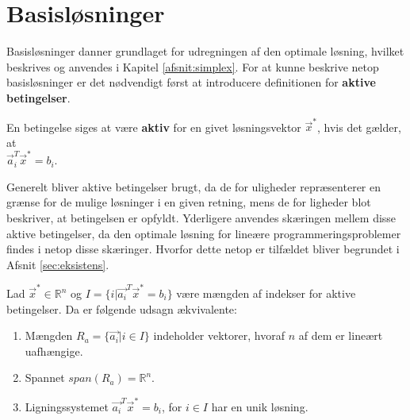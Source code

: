 \section{Basisløsninger}


Basisløsninger danner grundlaget for udregningen af den optimale løsning, hvilket beskrives og anvendes i Kapitel \ref{afsnit:simplex}. For at kunne beskrive netop basisløsninger er det nødvendigt først at introducere definitionen for \textbf{aktive betingelser}.%

\begin{defn}
En betingelse siges at være \textbf{aktiv} for en givet løsningsvektor $\vec{x}^*$, hvis det gælder, at\\ $\vec{a}_i^T \vec{x}^* = b_i$.
\label{def:aktiv}
\end{defn}

Generelt bliver aktive betingelser brugt, da de for uligheder repræsenterer en grænse for de mulige løsninger i en given retning, mens de for ligheder blot beskriver, at betingelsen er opfyldt.
Yderligere anvendes skæringen mellem disse aktive betingelser, da den optimale løsning for lineære programmeringsproblemer findes i netop disse skæringer. Hvorfor dette netop er tilfældet bliver begrundet i Afsnit \ref{sec:eksistens}.

\begin{stn}
Lad $\vec{x}^* \in \mathds{R}^n$ og $I = \{i | \vec{a_i}^T \vec{x}^* = b_i\}$ være mængden af indekser for aktive betingelser. Da er følgende udsagn ækvivalente:
\begin{enumerate}[label=(\alph*)]
\item Mængden $R_a =\{\vec{a_i}| i\in I\}$ indeholder vektorer, hvoraf $n$ af dem er lineært uafhængige.
\item Spannet $span(R_a) = \mathds{R}^n$.
\item Ligningssystemet $\vec{a_i}^T \vec{x}^* = b_i$, for $i \in I$ har en unik løsning.
\end{enumerate}
\label{stn:uniklosning}
\end{stn} %

